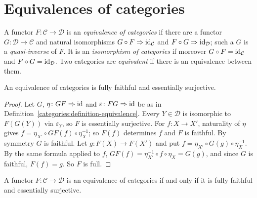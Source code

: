 \section{Equivalences of categories}\label{categories:section-equivalences}

\begin{definition}\label{categories:definition-equivalence}
A functor $F \colon \mathcal{C} \to \mathcal{D}$ is an \emph{equivalence of
categories} if there are a functor $G \colon \mathcal{D} \to \mathcal{C}$ and natural
isomorphisms $G \circ F \Rightarrow \mathrm{id}_{\mathcal{C}}$ and
$F \circ G \Rightarrow \mathrm{id}_{\mathcal{D}}$; such a $G$ is a \emph{quasi-inverse} of
$F$. It is an \emph{isomorphism of categories} if moreover $G \circ F = \mathrm{id}_{\mathcal{C}}$
and $F \circ G = \mathrm{id}_{\mathcal{D}}$. Two categories are \emph{equivalent} if there is an
equivalence between them.
\end{definition}

\begin{lemma}\label{categories:lemma-equivalence-fully-faithful}
An equivalence of categories is fully faithful and essentially surjective.
\end{lemma}

\begin{proof}
Let $G$, $\eta \colon GF \Rightarrow \mathrm{id}$ and $\varepsilon \colon FG \Rightarrow \mathrm{id}$ be as
in Definition~\ref{categories:definition-equivalence}. Every $Y \in \mathcal{D}$ is
isomorphic to $F(G(Y))$ via $\varepsilon_Y$, so $F$ is essentially surjective.
For $f \colon X \to X'$, naturality of $\eta$ gives
$f = \eta_{X'} \circ GF(f) \circ \eta_X^{-1}$; so $F(f)$ determines $f$ and $F$ is
faithful. By symmetry $G$ is faithful. Let $g \colon F(X) \to F(X')$ and put
$f = \eta_{X'} \circ G(g) \circ \eta_X^{-1}$. By the same formula applied to $f$,
$GF(f) = \eta_{X'}^{-1} \circ f \circ \eta_X = G(g)$, and since $G$ is faithful,
$F(f) = g$. So $F$ is full.
\end{proof}

\begin{theorem}\label{categories:theorem-equivalence-criterion}
A functor $F \colon \mathcal{C} \to \mathcal{D}$ is an equivalence of categories if
and only if it is fully faithful and essentially surjective.
\end{theorem}

